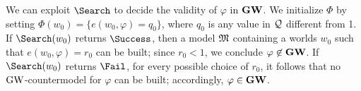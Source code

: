 We can exploit $\Search$ to decide the validity of $\varphi$ in
$\mathbf{GW}$.  We initialize $\Phi$ by setting $\Phi(w_0)=\{e(w_0,\varphi)= q_0\}$, where
$q_0$ is any value in $\mathcal{Q}$ different from 1.  If $\Search(w_0)$
returns $\Success$, then a model $\mathfrak{M}$ containing a worlds $w_0$ such
that $e(w_0,\varphi)=r_0$ can be built; since $r_0 < 1$, we conclude
$\varphi\not\in \mathbf{GW}$.  If $\Search(w_0)$ returns $\Fail$, for every
possible choice of $r_0$, it follows that no $\mbox{$\mathrm{GW}$}$-countermodel for
$\varphi$ can be built; accordingly, $\varphi\in \mathbf{GW}$.





